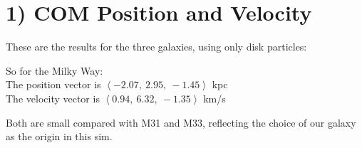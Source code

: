 

\setlength{\parskip}{0.2em}
\setlength{\skip\footins}{20pt}

\newcommand{\hmwkClass}{ASTR 400B}
\newcommand{\hmwkTitle}{Homework 4}
\newcommand{\hmwkDueDate}{Feb 13, 2020}



	
\maketitle

\section*{1) COM Position and Velocity}

These are the results for the three galaxies, using only disk particles:\\

{ \par}\vspace{5mm}

So for the Milky Way: \\
The position vector is $\left< -2.07,\ 2.95,\ -1.45\right>$ kpc\\
The velocity vector is $\left<0.94,\ 6.32,\ -1.35 \right>$ km/s

Both are small compared with M31 and M33, reflecting the choice of our galaxy as the origin in this sim.

